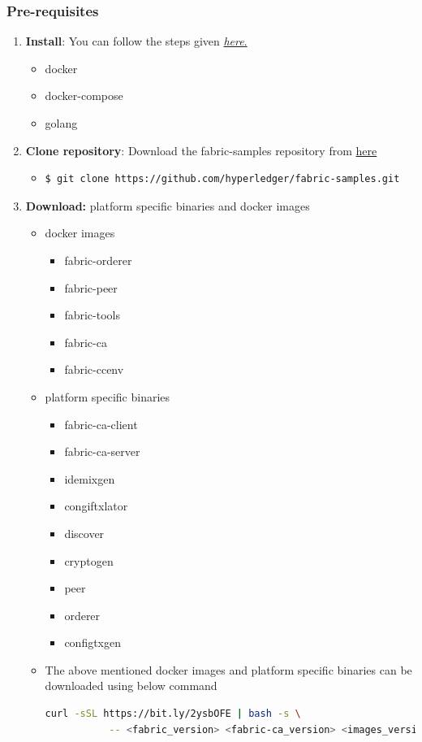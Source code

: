 \subsubsection{Pre-requisites}
\begin{enumerate}
    \item \textbf{Install}: You can follow the steps given \href{https://hyperledger-fabric.readthedocs.io/en/release-2.0/prereqs.html}{\textit{here}.}
    \begin{itemize}
    \item docker
    \item docker-compose
    \item golang
    \end{itemize}
    \item \textbf{Clone repository}: Download the fabric-samples repository from \href{https://github.com/hyperledger/fabric-samples}{here}
    \begin{itemize}
        \item \begin{lstlisting}[language=bash]
  $ git clone https://github.com/hyperledger/fabric-samples.git
\end{lstlisting}
\end{itemize}
\item \textbf{Download:} platform specific binaries and docker images
\begin{itemize}
    \item docker images
    \begin{itemize}
         \item fabric-orderer
        \item fabric-peer
        \item fabric-tools
        \item fabric-ca
        \item fabric-ccenv
    \end{itemize}
      \item platform specific binaries
    \begin{itemize}
        \item fabric-ca-client
        \item fabric-ca-server
        \item idemixgen
        \item congiftxlator
        \item discover
        \item cryptogen
        \item peer
        \item orderer
        \item configtxgen
    \end{itemize}
    \item The above mentioned docker images and platform specific binaries can be downloaded using below command \begin{lstlisting}[language=bash]
   curl -sSL https://bit.ly/2ysbOFE | bash -s \
           -- <fabric_version> <fabric-ca_version> <images_version>
\end{lstlisting} 

\end{itemize}
\end{enumerate}

